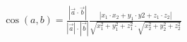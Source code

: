 \documentclass[preview]{standalone}
\begin{document}
\begin{align*}
\cos(a,b) = \frac{|\vec{a} \cdot \vec{b}|}{|\vec{a}|\cdot|\vec{b}|}\frac{|x_1 \cdot x_2 + y_1 \cdot y2 + z_1 \cdot z_2|}{\sqrt{x_1^2 + y_1^2 + z_1^2} \cdot \sqrt{x_2^2 + y_2^2 + z_2^2}}
\end{align*}
\end{document}
